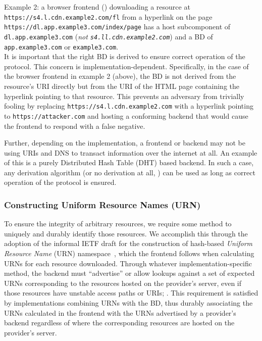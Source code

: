 Example 2: a browser frontend () downloading a resource at \texttt{https://s4.l.cdn.example2.com/fl}
from a hyperlink on the page \texttt{https://dl.app.example3.com/index/page} has
a host subcomponent of \texttt{dl.app.example3.com} (\emph{not
\texttt{s4.ll.cdn.example2.com}}) and a BD of \texttt{app.example3.com} or
\texttt{example3.com}. \\

It is important that the right BD is derived to ensure correct operation of the
protocol. This concern is implementation-dependent. Specifically, in the case of
the browser frontend in example 2 (above), the BD is not derived from the
resource's URI directly but from the URI of the HTML page containing the
hyperlink pointing to that resource. This prevents an adversary from trivially
fooling \SYSTEM{} by replacing \texttt{https://s4.l.cdn.example2.com} with a
hyperlink pointing to \texttt{https://attacker.com} and hosting a conforming
\SYSTEM{} backend that would cause the frontend to respond with a false
negative.

Further, depending on the implementation, a frontend or backend may not be using
URIs and DNS to transact information over the internet at all. An example of
this is a purely Distributed Hash Table (DHT) based backend. In such a case, any
derivation algorithm (or no derivation at all, ) can be
used as long as correct operation of the protocol is ensured.

\subsubsection{Constructing Uniform Resource Names (URN)}

To ensure the integrity of arbitrary resources, we require some method to
uniquely and durably identify those resources. We accomplish this through the
adoption of the informal IETF draft for the construction of hash-based
\emph{Uniform Resource Name} (URN) namespace~\cite{draft-URN}, which the
frontend follows when calculating URNs for each resource downloaded. Through
whatever implementation-specific method, the backend must ``advertise'' or allow
lookups against a set of expected URNs corresponding to the resources hosted on
the provider's server, even if those resources have unstable access paths or
URIs; . This requirement is satisfied by implementations combining URNs with
the BD, thus durably associating the URNs calculated in the frontend with the
URNs advertised by a provider's backend regardless of where the corresponding
resources are hosted on the provider's server.

